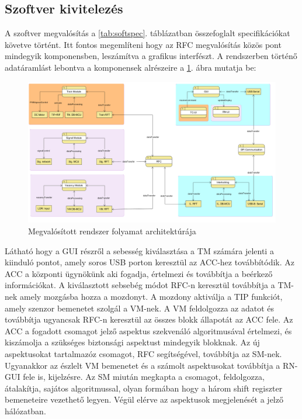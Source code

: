 \documentclass[a4paper,12pt]{article}
\begin{document}
\newpage
\subsection{Szoftver kivitelezés}
A szoftver megvalósítás a \ref{tab:softspec}. táblázatban összefoglalt specifikációkat követve történt.
Itt fontos megemlíteni hogy az RFC megvalósítás közös pont mindegyik komponensben, leszámítva a grafikus interfészt.
A rendszerben történő adatáramlást lebontva a komponensek alrészeire a \ref{fig:ra_data_flow_diagram}. ábra mutatja be:

\begin{figure}[htp]
    \centering
	\includegraphics[width=\textwidth]{images/ra_data_flow_diagram.png}
    \caption[Rendszer folyamat architektúra]{Megvalósított rendszer folyamat architektúrája}
	\label{fig:ra_data_flow_diagram}
\end{figure}
Látható hogy a GUI részről a sebesség kiválasztása a TM számára jelenti a kiinduló pontot, amely soros USB porton keresztül az ACC-hez továbbítódik.
Az ACC a központi ügynökünk aki fogadja, értelmezi és továbbítja a beérkező információkat.
A kiválasztott sebsebég módot RFC-n keresztül továbbítja a TM-nek amely mozgásba hozza a mozdonyt.
A mozdony aktiválja a TIP funkciót, amely szenzor bemenetet szolgál a VM-nek.
A VM feldolgozza az adatot és továbbítja ugyancsak RFC-n keresztül az összes blokk állapotát az ACC fele.
Az ACC a fogadott csomagot jelző aspektus szekvenáló algoritmusával értelmezi, és kiszámolja a szükséges biztonsági aspektust mindegyik blokknak.
Az új aspektusokat tartalmazóz csomagot, RFC segítségével, továbbítja az SM-nek. Ugyanakkor az észlelt VM bemenetet és a számolt aspektusokat továbbítja a RN-GUI fele is, kijelzésre.
Az SM miután megkapta a csomagot, feldolgozza, átalakítja, sajátos algoritmussal, olyan formában hogy a három shift regiszter bemeneteire vezethető legyen.
Végül elérve az aspektusok megjelenését a jelző hálózatban.
\end{document}
